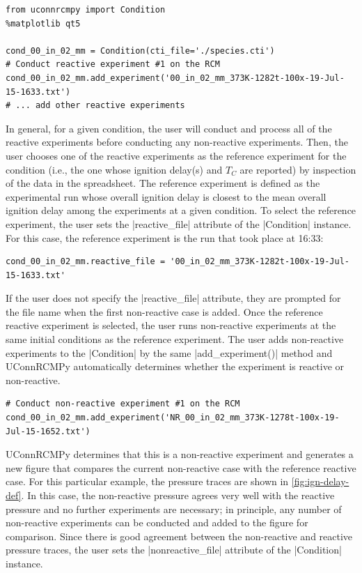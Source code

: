 \documentclass[12pt]{../ussci}
\begin{document}
\begin{verbatim}
from uconnrcmpy import Condition
%matplotlib qt5

cond_00_in_02_mm = Condition(cti_file='./species.cti')
# Conduct reactive experiment #1 on the RCM
cond_00_in_02_mm.add_experiment('00_in_02_mm_373K-1282t-100x-19-Jul-15-1633.txt')
# ... add other reactive experiments
\end{verbatim}

In general, for a given condition, the user will conduct and process all
of the reactive experiments before conducting any non-reactive
experiments. Then, the user chooses one of the reactive experiments as
the reference experiment for the condition (i.e., the one whose ignition
delay(s) and \(T_C\) are reported) by inspection of the data in the
spreadsheet. The reference experiment is defined as the experimental run
whose overall ignition delay is closest to the mean overall ignition
delay among the experiments at a given condition. To select the
reference experiment, the user sets the \python|reactive_file|
attribute of the \python|Condition| instance. For this case, the
reference experiment is the run that took place at 16:33:

\begin{verbatim}
cond_00_in_02_mm.reactive_file = '00_in_02_mm_373K-1282t-100x-19-Jul-15-1633.txt'
\end{verbatim}

If the user does not specify the \python|reactive_file| attribute,
they are prompted for the file name when the first non-reactive case is added.
Once the reference reactive experiment is selected, the user runs non-reactive
experiments at the same initial conditions as the reference experiment. The user
adds non-reactive experiments to the \python|Condition| by the same
\python|add_experiment()| method and UConnRCMPy automatically
determines whether the experiment is reactive or non-reactive.

\begin{verbatim}
# Conduct non-reactive experiment #1 on the RCM
cond_00_in_02_mm.add_experiment('NR_00_in_02_mm_373K-1278t-100x-19-Jul-15-1652.txt')
\end{verbatim}

UConnRCMPy determines that this is a non-reactive experiment and
generates a new figure that compares the current non-reactive case with
the reference reactive case. For this particular example, the pressure traces
are shown in \cref{fig:ign-delay-def}. In this case, the non-reactive
pressure agrees very well with the reactive pressure and no further
experiments are necessary; in principle, any number of non-reactive
experiments can be conducted and added to the figure for comparison.
Since there is good agreement between the non-reactive and reactive
pressure traces, the user sets the \python|nonreactive_file| attribute of the
\python|Condition| instance.
\end{document}

